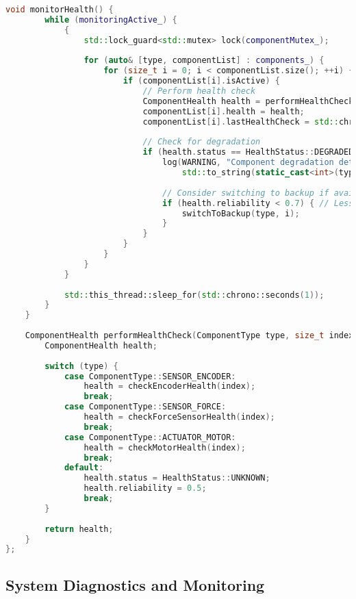 \begin{lstlisting}[language=C++, caption=Redundant System Architecture]
    void monitorHealth() {
        while (monitoringActive_) {
            {
                std::lock_guard<std::mutex> lock(componentMutex_);
                
                for (auto& [type, componentList] : components_) {
                    for (size_t i = 0; i < componentList.size(); ++i) {
                        if (componentList[i].isActive) {
                            // Perform health check
                            ComponentHealth health = performHealthCheck(type, i);
                            componentList[i].health = health;
                            componentList[i].lastHealthCheck = std::chrono::steady_clock::now();
                            
                            // Check for degradation
                            if (health.status == HealthStatus::DEGRADED) {
                                log(WARNING, "Component degradation detected: type=" + 
                                    std::to_string(static_cast<int>(type)) + ", index=" + std::to_string(i));
                                
                                // Consider switching to backup if available
                                if (health.reliability < 0.7) { // Less than 70% reliability
                                    switchToBackup(type, i);
                                }
                            }
                        }
                    }
                }
            }
            
            std::this_thread::sleep_for(std::chrono::seconds(1));
        }
    }
    
    ComponentHealth performHealthCheck(ComponentType type, size_t index) {
        ComponentHealth health;
        
        switch (type) {
            case ComponentType::SENSOR_ENCODER:
                health = checkEncoderHealth(index);
                break;
            case ComponentType::SENSOR_FORCE:
                health = checkForceSensorHealth(index);
                break;
            case ComponentType::ACTUATOR_MOTOR:
                health = checkMotorHealth(index);
                break;
            default:
                health.status = HealthStatus::UNKNOWN;
                health.reliability = 0.5;
                break;
        }
        
        return health;
    }
};
\end{lstlisting}

\subsection{System Diagnostics and Monitoring}
\label{subsec:diagnostics_monitoring}

